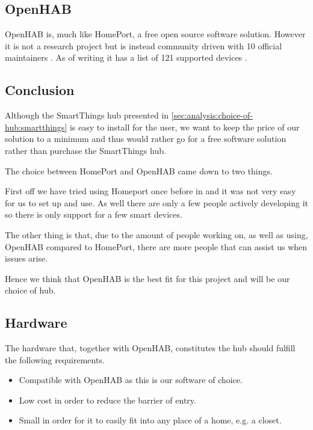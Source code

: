 \subsection{OpenHAB}
\label{sec:analysis:choice-of-hub:openhab}

OpenHAB \cite{OPENHAB} is, much like HomePort, a free open source software solution.
However it is not a research project but is instead community driven with 10 official maintainers \cite{openhab:maintainers}.
As of writing it has a list of 121 supported devices \cite{openhab:supported-technologies}.

\subsection{Conclusion}
\label{sec:analysis:choice-of-hub:conclusion}

Although the SmartThings hub presented in \cref{sec:analysis:choice-of-hub:smartthings} is easy to install for the user, we want to keep the price of our solution to a minimum and thus would rather go for a free software solution rather than purchase the SmartThings hub.

The choice between HomePort and OpenHAB came down to two things.

First off we have tried using Homeport once before in \cite{previous-report} and it was not very easy for us to set up and use.
As well there are only a few people actively developing it so there is only support for a few smart devices.

The other thing is that, due to the amount of people working on, as well as using, OpenHAB compared to HomePort, there are more people that can assist us when issues arise.

Hence we think that OpenHAB is the best fit for this project and will be our choice of hub.

\subsection{Hardware}

The hardware that, together with OpenHAB, constitutes the hub should fulfill the following requirements.

\begin{itemize}
\item Compatible with OpenHAB as this is our software of choice.
\item Low cost in order to reduce the barrier of entry.
\item Small in order for it to easily fit into any place of a home, e.g. a closet.
\end{itemize}

